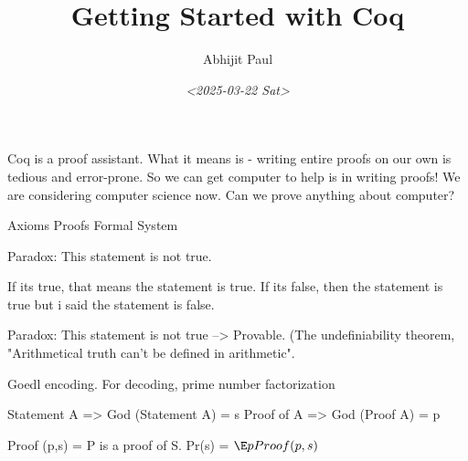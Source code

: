 \documentclass[11pt]{article}
\author{Abhijit Paul}
\date{\textit{<2025-03-22 Sat>}}
\title{Getting Started with Coq}
\begin{document}
\maketitle
\tableofcontents

Coq is a proof assistant. What it means is - writing entire proofs on our own is tedious and error-prone. So we can get computer to help is in writing proofs! We are considering computer science now. Can we prove anything about computer?

Axioms
Proofs
Formal System


Paradox: This statement is not true.

If its true, that means the statement is true.
If its false, then the statement is true but i said the statement is false.

Paradox: This statement is not true --> Provable. (The undefiniability theorem, "Arithmetical truth can't be defined in arithmetic".

Goedl encoding. For decoding, prime number factorization


Statement A => God (Statement A) = s
Proof of A => God (Proof A) = p

Proof (p,s) = P is a proof of S.
Pr(s) = \(\E p Proof(p,s)\)  
\end{document}
